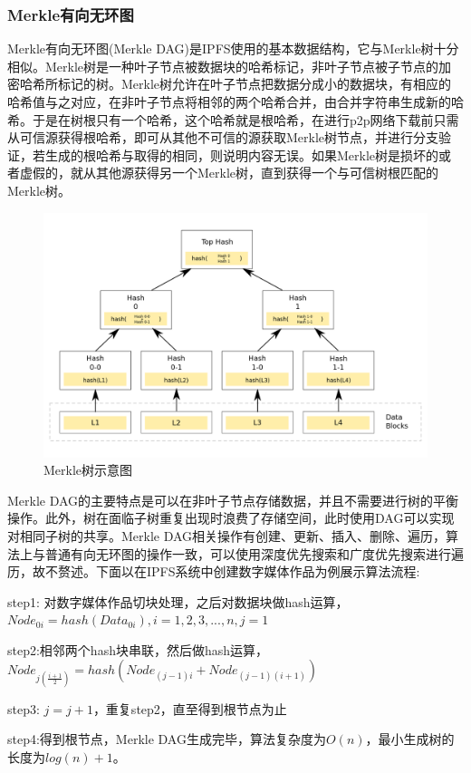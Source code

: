 \documentclass[withoutpreface,bwprint]{cumcmthesis} %
\begin{document}
\subsubsection{Merkle有向无环图}

Merkle有向无环图(Merkle DAG)是IPFS使用的基本数据结构，它与Merkle树十分相似。Merkle树是一种叶子节点被数据块的哈希标记，非叶子节点被子节点的加密哈希所标记的树。Merkle树允许在叶子节点把数据分成小的数据块，有相应的哈希值与之对应，在非叶子节点将相邻的两个哈希合并，由合并字符串生成新的哈希。于是在树根只有一个哈希，这个哈希就是根哈希，在进行p2p网络下载前只需从可信源获得根哈希，即可从其他不可信的源获取Merkle树节点，并进行分支验证，若生成的根哈希与取得的相同，则说明内容无误。如果Merkle树是损坏的或者虚假的，就从其他源获得另一个Merkle树，直到获得一个与可信树根匹配的Merkle树。

\begin{figure}[!h]
	\centering
	\includegraphics[width=.8\textwidth]{logo-108.png}
	\caption{Merkle树示意图}
\end{figure}

Merkle DAG的主要特点是可以在非叶子节点存储数据，并且不需要进行树的平衡操作。此外，树在面临子树重复出现时浪费了存储空间，此时使用DAG可以实现对相同子树的共享。Merkle DAG相关操作有创建、更新、插入、删除、遍历，算法上与普通有向无环图的操作一致，可以使用深度优先搜索和广度优先搜索进行遍历，故不赘述。下面以在IPFS系统中创建数字媒体作品为例展示算法流程:

step1: 对数字媒体作品切块处理，之后对数据块做hash运算，$Node_{0i}=hash(Data_{0i}),i=1,2,3,...,n,j=1$

step2:相邻两个hash块串联，然后做hash运算，$Node_{j(\frac{i+1}{2})}=hash(Node_{(j-1)i}+Node_{(j-1)(i+1)})$

step3: $j=j+1$，重复step2，直至得到根节点为止

step4:得到根节点，Merkle DAG生成完毕，算法复杂度为$O(n)$，最小生成树的长度为$log(n)+1$。
\end{document}
